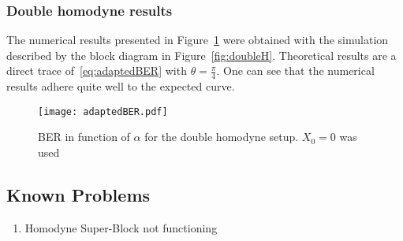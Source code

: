 \subsubsection*{Double homodyne results}\label{subsec:DHresults}

The numerical results presented in Figure~\ref{fig:adaptedber} were obtained with the simulation described by the block diagram in Figure~\ref{fig:doubleH}. Theoretical results are a direct trace of~\eqref{eq:adaptedBER} with $\theta=\frac{\pi}{4}$. One can see that the numerical results adhere quite well to the expected curve.

\begin{figure}[h]
\centering
\texttt{[image: adaptedBER.pdf]}
\caption{BER in function of $\alpha$ for the double homodyne setup. $X_0=0$ was used}
\label{fig:adaptedber}
\end{figure}

%
%
%
%
%
%
%
%
%
%
%
%
%

\subsection*{Known Problems}
\begin{enumerate}
    \item Homodyne Super-Block not functioning
\end{enumerate}



 

